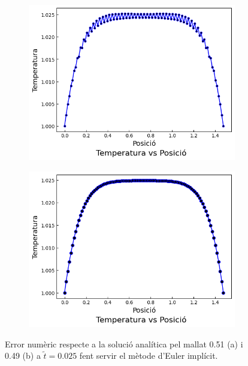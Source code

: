 \documentclass{article}
\begin{document}
\begin{figure}[h]
    \centering
    \begin{subfigure}[b]{0.35\textwidth}
        \includegraphics[width=\textwidth]{images/T_vs_z_at1.png} 
        \caption{}
        \label{fig:err_euler_imp_at1}
    \end{subfigure}
    \hspace{1.5cm}
    \begin{subfigure}[b]{0.35\textwidth}
        \includegraphics[width=\textwidth]{images/T_vs_z_at2.png}
        \caption{} 
        \label{fig:err_euler_imp_at2}
    \end{subfigure}
    \caption{Error numèric respecte a la solució analítica pel mallat 0.51 (a) i 0.49 (b) a $\tilde{t}=0.025$ fent servir el mètode d'Euler implícit.}
    \label{fig:err_euler_implicit}
\end{figure}
\end{document}

